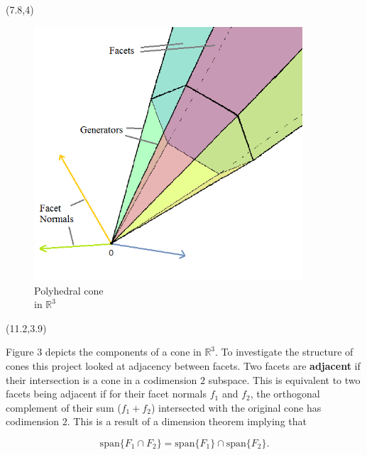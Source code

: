 \documentclass[a0,landscape]{a0poster}  %
\newcommand{\R}{\mathbb{R}}
\theoremstyle{plain}
\begin{document}
\begin{textblock}{4}(7.8,4)
\large {
\begin{figure}
\vspace{2mm}
\hspace{30mm}
\includegraphics[width=100mm,scale=1]{polyhedralconescew.png}

\vspace{-5mm}
\caption{
Polyhedral cone \\ in $\R^3$
}

\end{figure}
}
\end{textblock}

\begin{textblock}{5.3}(11.2,3.9)
\large {
Figure 3 depicts the components of a cone in $\R^3$. To investigate the structure of cones this project looked at adjacency between facets. Two facets are {\bf adjacent} if their intersection is a cone in a codimension  $2$ subspace. This is equivalent to two facets being adjacent if for their facet normals $f_1$ and $f_2$, the  orthogonal complement of their sum ($f_1+f_2$) intersected with the original cone has codimension $2$. This is a result of a dimension theorem implying that

\vspace{-1.5cm} $$\text{span}\{F_1\cap F_2\} = \text{span}\{F_1\} \cap \text{span}\{F_2\}.$$ 
}
\end{textblock}
\end{document}
